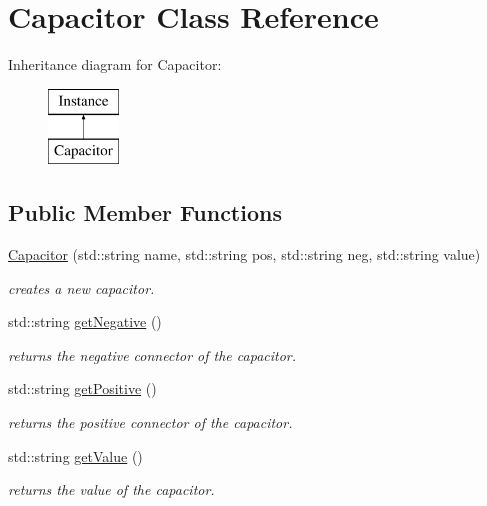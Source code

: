 \hypertarget{class_s_p_i_c_e_1_1_capacitor}{}\section{Capacitor Class Reference}
\label{class_s_p_i_c_e_1_1_capacitor}
Inheritance diagram for Capacitor\+:\begin{figure}[H]
\begin{center}
\leavevmode
\includegraphics[height=2.000000cm]{class_s_p_i_c_e_1_1_capacitor}
\end{center}
\end{figure}
\subsection*{Public Member Functions}
\begin{DoxyCompactItemize}
\item 
\hyperlink{class_s_p_i_c_e_1_1_capacitor_af3141143353c1a45fb2f2f35d3ddd28d}{Capacitor} (std\+::string name, std\+::string pos, std\+::string neg, std\+::string value)
\begin{DoxyCompactList}\small\item\em creates a new capacitor. \end{DoxyCompactList}\item 
\mbox{\label{class_s_p_i_c_e_1_1_capacitor_a8b4ab73ed1d99c533aa22af0a37ebb0d}} 
std\+::string \hyperlink{class_s_p_i_c_e_1_1_capacitor_a8b4ab73ed1d99c533aa22af0a37ebb0d}{get\+Negative} ()
\begin{DoxyCompactList}\small\item\em returns the negative connector of the capacitor. \end{DoxyCompactList}\item 
\mbox{\label{class_s_p_i_c_e_1_1_capacitor_a1adb347b9a2c2da556e4417ab0eec0e1}} 
std\+::string \hyperlink{class_s_p_i_c_e_1_1_capacitor_a1adb347b9a2c2da556e4417ab0eec0e1}{get\+Positive} ()
\begin{DoxyCompactList}\small\item\em returns the positive connector of the capacitor. \end{DoxyCompactList}\item 
\mbox{\label{class_s_p_i_c_e_1_1_capacitor_a4c052cb2622c580a250b2c783a436882}} 
std\+::string \hyperlink{class_s_p_i_c_e_1_1_capacitor_a4c052cb2622c580a250b2c783a436882}{get\+Value} ()
\begin{DoxyCompactList}\small\item\em returns the value of the capacitor. \end{DoxyCompactList}\end{DoxyCompactItemize}


